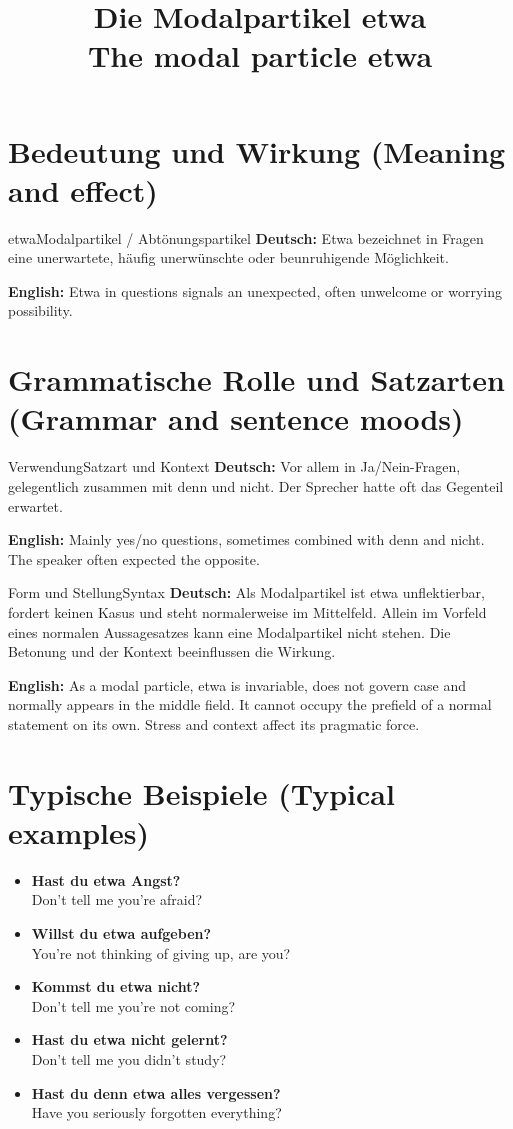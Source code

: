 \documentclass[a4paper,11pt]{article}
\title{Die Modalpartikel \glqq etwa\grqq\\{\large\textnormal{The modal particle etwa}}}
\date{}
\newcommand{\GermanText}[1]{\textbf{Deutsch: }#1\par}
\newcommand{\EnglishText}[1]{{\small\color{SoftGray}\textbf{English: }#1\par}}
\newcommand{\ExampleItem}[2]{\item \textbf{#1}\\{\small\color{SoftGray}#2}}
\begin{document}
\maketitle
\tableofcontents
\section{Bedeutung und Wirkung \textnormal{(Meaning and effect)}}
\begin{grammarentry}{etwa}{Modalpartikel / Abtönungspartikel}
\GermanText{Etwa bezeichnet in Fragen eine unerwartete, häufig unerwünschte oder beunruhigende Möglichkeit.}
\EnglishText{Etwa in questions signals an unexpected, often unwelcome or worrying possibility.}
\end{grammarentry}
\section{Grammatische Rolle und Satzarten \textnormal{(Grammar and sentence moods)}}
\begin{grammarentry}{Verwendung}{Satzart und Kontext}
\GermanText{Vor allem in Ja/Nein-Fragen, gelegentlich zusammen mit denn und nicht. Der Sprecher hatte oft das Gegenteil erwartet.}
\EnglishText{Mainly yes/no questions, sometimes combined with denn and nicht. The speaker often expected the opposite.}
\end{grammarentry}
\begin{grammarentry}{Form und Stellung}{Syntax}
\GermanText{Als Modalpartikel ist etwa unflektierbar, fordert keinen Kasus und steht normalerweise im Mittelfeld. Allein im Vorfeld eines normalen Aussagesatzes kann eine Modalpartikel nicht stehen. Die Betonung und der Kontext beeinflussen die Wirkung.}
\EnglishText{As a modal particle, etwa is invariable, does not govern case and normally appears in the middle field. It cannot occupy the prefield of a normal statement on its own. Stress and context affect its pragmatic force.}
\end{grammarentry}
\section{Typische Beispiele \textnormal{(Typical examples)}}
\begin{exbox}\begin{itemize}
\ExampleItem{Hast du etwa Angst?}{Don't tell me you're afraid?}
\ExampleItem{Willst du etwa aufgeben?}{You're not thinking of giving up, are you?}
\ExampleItem{Kommst du etwa nicht?}{Don't tell me you're not coming?}
\ExampleItem{Hast du etwa nicht gelernt?}{Don't tell me you didn't study?}
\ExampleItem{Hast du denn etwa alles vergessen?}{Have you seriously forgotten everything?}
\end{itemize}\end{exbox}
\end{document}
